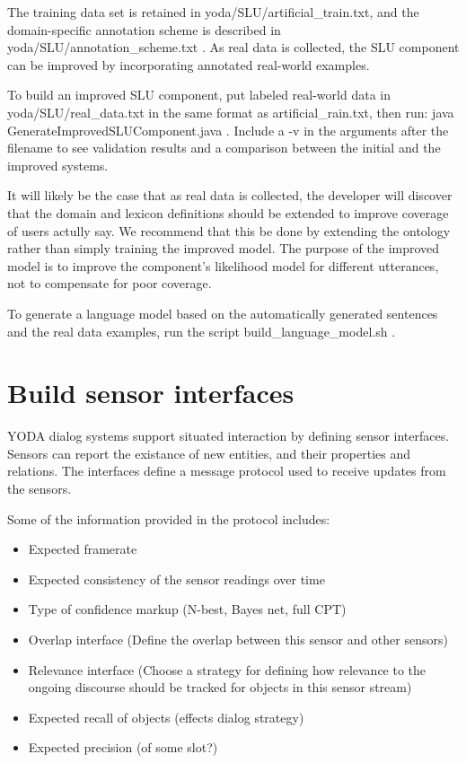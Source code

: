 \documentclass[10pt]{article}
\begin{document}
The training data set is retained in yoda/SLU/artificial\_train.txt, and the domain-specific annotation scheme is described in yoda/SLU/annotation\_scheme.txt .
As real data is collected, the SLU component can be improved by incorporating annotated real-world examples.

To build an improved SLU component, put labeled real-world data in yoda/SLU/real\_data.txt in the same format as artificial\_rain.txt, then run: java GenerateImprovedSLUComponent.java .
Include a -v in the arguments after the filename to see validation results and a comparison between the initial and the improved systems.

It will likely be the case that as real data is collected, the developer will discover that the domain and lexicon definitions should be extended to improve coverage of users actully say.
We recommend that this be done by extending the ontology rather than simply training the improved model.
The purpose of the improved model is to improve the component's likelihood model for different utterances, not to compensate for poor coverage.

To generate a language model based on the automatically generated sentences and the real data examples, run the script build\_language\_model.sh .


\section {Build sensor interfaces}
YODA dialog systems support situated interaction by defining sensor interfaces.
Sensors can report the existance of new entities, and their properties and relations.
The interfaces define a message protocol used to receive updates from the sensors.

Some of the information provided in the protocol includes:
\begin{itemize}
\item Expected framerate
\item Expected consistency of the sensor readings over time
\item Type of confidence markup (N-best, Bayes net, full CPT)
\item Overlap interface (Define the overlap between this sensor and other sensors)
\item Relevance interface (Choose a strategy for defining how relevance to the ongoing discourse should be tracked for objects in this sensor stream)
\item Expected recall of objects (effects dialog strategy)
\item Expected precision (of some slot?)
\end{itemize}
\end{document}
